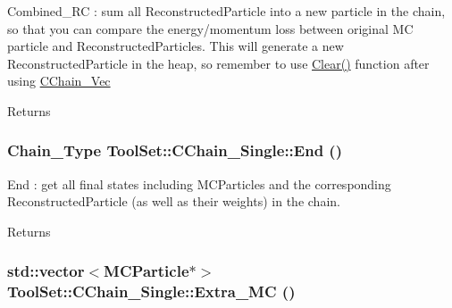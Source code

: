 Combined\_\-RC : sum all ReconstructedParticle into a new particle in the chain, so that you can compare the energy/momentum loss between original MC particle and ReconstructedParticles. This will generate a new ReconstructedParticle in the heap, so remember to use \hyperlink{classToolSet_1_1CChain__Single_ae991aff7b553d31f4073eb5aaf0e0440}{Clear()} function after using \hyperlink{classToolSet_1_1CChain__Vec}{CChain\_\-Vec}

\begin{DoxyReturn}{Returns}

\end{DoxyReturn}
\hypertarget{classToolSet_1_1CChain__Single_a9dc8f3c99668806d5bbe276758a1fc00}{
\subsubsection[{End}]{\setlength{\rightskip}{0pt plus 5cm}Chain\_\-Type ToolSet::CChain\_\-Single::End ()}}
\label{classToolSet_1_1CChain__Single_a9dc8f3c99668806d5bbe276758a1fc00}


End : get all final states including MCParticles and the corresponding ReconstructedParticle (as well as their weights) in the chain. \begin{DoxyReturn}{Returns}

\end{DoxyReturn}
\hypertarget{classToolSet_1_1CChain__Single_a35481afff23b06832e9987e8caaf7e14}{
\subsubsection[{Extra\_\-MC}]{\setlength{\rightskip}{0pt plus 5cm}std::vector$<$MCParticle$\ast$$>$ ToolSet::CChain\_\-Single::Extra\_\-MC ()}}
\label{classToolSet_1_1CChain__Single_a35481afff23b06832e9987e8caaf7e14}


